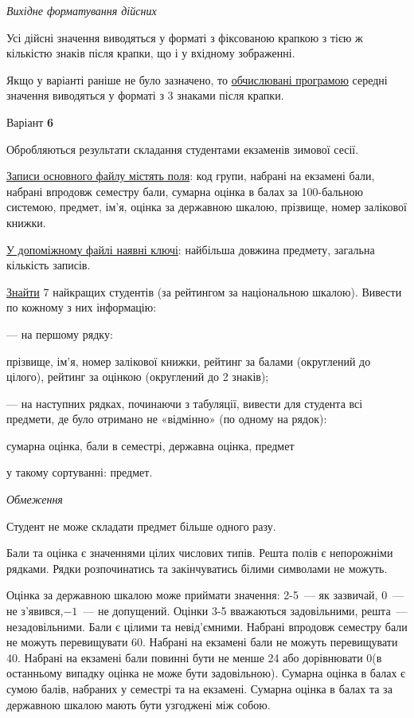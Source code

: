 \documentclass[11pt, ukrainian]{article}
\begin{document}
\textit{Вихідне форматування дійсних}

Усі дійсні значення виводяться у форматі з фіксованою крапкою з тією ж кількістю знаків після крапки, що і у вхідному зображенні.

Якщо у варіанті раніше не було зазначено, то \underline{обчислювані програмою} середні значення виводяться у форматі з 3 знаками після крапки.




\par
\newpage
{\center Варіант  \No \textbf { 6 }\par}
\bigskip
Обробляються результати складання студентами екзаменів зимової сесії.

\underline{Записи основного файлу містять поля}: код групи, набрані на екзамені бали, набрані впродовж семестру бали, сумарна оцінка в балах за 100-бальною системою, предмет, ім’я, оцінка за державною шкалою, прізвище, номер залікової книжки.

\underline{У допоміжному файлі наявні ключі}: найбільша довжина предмету, загальна кількість записів.

\underline{Знайти} 7 найкращих студентів (за рейтингом за національною шкалою). Вивести по кожному з них інформацію:\par
{\noindent}--- на першому рядку:\par
прізвище, ім’я, номер залікової книжки, рейтинг за балами (округлений до цілого), рейтинг за оцінкою (округлений до 2 знаків);

{\noindent}--- на наступних рядках, починаючи з табуляції, вивести для студента всі предмети, де було отримано не «відмінно» (по одному на рядок):\par
сумарна оцінка, бали в семестрі, державна оцінка, предмет

{\noindent}у такому сортуванні: предмет.


\bigskip\textit{Обмеження}

Студент не може складати предмет більше одного разу.

Бали та оцінка є значеннями цілих числових типів. Решта полів є непорожніми рядками.
Рядки розпочинатись та закінчуватись білими символами не можуть.

Оцінка за державною шкалою може приймати значення: 2-5~--- як зазвичай, 0~--- не з’явився,$-1$~--- не допущений. 
Оцінки 3-5 вважаються задовільними, решта~--- незадовільними. 
Бали є цілими та невід’ємними.
Набрані впродовж семестру бали не можуть перевищувати 60. 
Набрані на екзамені бали не можуть перевищувати 40. 
Набрані на екзамені бали повинні бути не менше 24 або дорівнювати 0(в останньому випадку оцінка не може бути задовільною). 
Сумарна оцінка в балах є сумою балів, набраних у семестрі та на екзамені.
Сумарна оцінка в балах та за державною шкалою мають бути узгоджені між собою.
\end{document}
